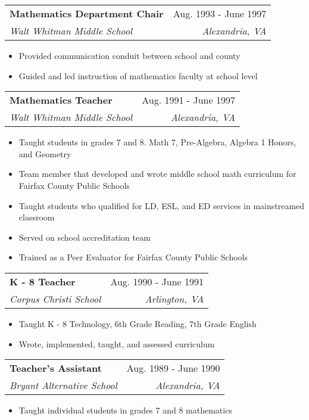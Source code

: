 \documentclass[letterpaper,11pt]{article}
\makeatletter
\newcommand{\resumeItem}[1]{
  \item\small{
    {#1 \vspace{-2pt}}
  }
}
\newcommand{\resumeSubheading}[4]{
  \vspace{-2pt}\item
    \begin{tabular*}{0.97\textwidth}[t]{l@{\extracolsep{\fill}}r}
      \textbf{#1} & #2 \\
      \textit{\small#3} & \textit{\small #4} \\
    \end{tabular*}\vspace{-7pt}
}
\newcommand{\resumeSubHeadingListEnd}{\end{itemize}}
\newcommand{\resumeItemListStart}{\begin{itemize}}
\makeatother
\begin{document}
  \resumeSubheading
      {Mathematics Department Chair}{Aug. 1993 - June 1997}
      {Walt Whitman Middle School}{Alexandria, VA}
      \resumeItemListStart
      \resumeItem{Provided communication conduit between school and county}
      \resumeItem{Guided and led instruction of mathematics faculty at school level}
    \resumeSubHeadingListEnd

  \resumeSubheading
      {Mathematics Teacher}{Aug. 1991 - June 1997}
      {Walt Whitman Middle School}{Alexandria, VA}
      \resumeItemListStart
      \resumeItem{Taught students in grades 7 and 8. Math 7, Pre-Algebra, Algebra 1 Honors, and Geometry}
      \resumeItem{Team member that developed and wrote middle school math curriculum for Fairfax County Public Schools}
      \resumeItem{Taught students who qualified for LD, ESL, and ED services in mainstreamed classroom}
      \resumeItem{Served on school accreditation team}
      \resumeItem{Trained as a Peer Evaluator for Fairfax County Public Schools}
    \resumeSubHeadingListEnd

  \resumeSubheading
      {K - 8 Teacher}{Aug. 1990 - June 1991}
      {Corpus Christi School}{Arlington, VA}
      \resumeItemListStart
      \resumeItem{Taught K - 8 Technology, 6th Grade Reading, 7th Grade English}
      \resumeItem{Wrote, implemented, taught, and assessed curriculum}
    \resumeSubHeadingListEnd

  \resumeSubheading
      {Teacher's Assistant}{Aug. 1989 - June 1990}
      {Bryant Alternative School}{Alexandria, VA}
      \resumeItemListStart
      \resumeItem{Taught individual students in grades 7 and 8 mathematics}
    \resumeSubHeadingListEnd

\end{document}
